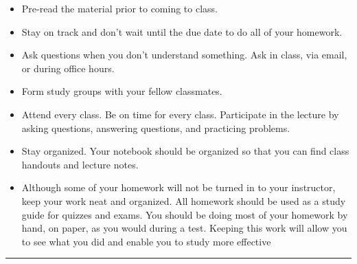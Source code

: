 \begin{itemize}

\item  Pre-read the material prior to coming to class.

\item Stay on track and don't wait until the due date to do all of your homework.
\item  Ask questions when you don't understand something. Ask in class, via email, or during
office hours.

\item Form study groups with your fellow classmates.
\item  Attend every class. Be on time for every class. Participate in the lecture by asking
questions, answering questions, and practicing problems.

\item Stay organized. Your notebook should be organized so that you can find class handouts
and lecture notes.

\item Although some of your homework will not be turned in to your instructor, keep your work
neat and organized. All homework should be used as a study guide for quizzes and
exams. You should be doing most of your homework by hand, on paper, as you would
during a test. Keeping this work will allow you to see what you did and enable you to
study more effective


\end{itemize}

 \vspace{2ex}\hrule\vspace{2ex}
